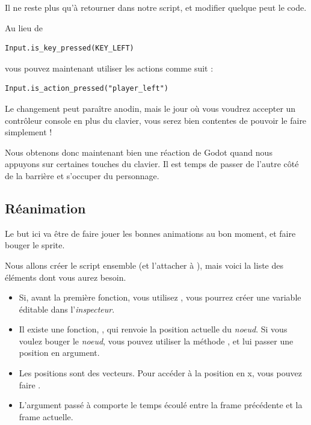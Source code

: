 Il ne reste plus qu'à retourner dans notre script, et modifier quelque peut le code.

Au lieu de

\begin{lstlisting}
Input.is_key_pressed(KEY_LEFT)
\end{lstlisting}

vous pouvez maintenant utiliser les actions comme suit :

\begin{lstlisting}
Input.is_action_pressed("player_left")
\end{lstlisting}

Le changement peut paraître anodin, mais le jour où vous voudrez accepter un contrôleur console en plus du clavier, vous serez bien contentes de pouvoir le faire simplement !

Nous obtenons donc maintenant bien une réaction de Godot quand nous appuyons sur certaines touches du clavier. Il est temps de passer de l'autre côté de la barrière et s'occuper du personnage.

\subsection{Réanimation}

Le but ici va être de faire jouer les bonnes animations au bon moment, et faire bouger le sprite.

Nous allons créer le script ensemble (et l'attacher à ), mais voici la liste des éléments dont vous aurez besoin.

\begin{itemize}
\item Si, avant la première fonction, vous utilisez , vous pourrez créer une variable éditable dans l'\emph{inspecteur}.
\item Il existe une fonction, , qui renvoie la position actuelle du \emph{noeud}. Si vous voulez bouger le \emph{noeud}, vous pouvez utiliser la méthode , et lui passer une position en argument.
\item Les positions sont des vecteurs. Pour accéder à la position en x, vous pouvez faire .
\item L'argument  passé à  comporte le temps écoulé entre la frame précédente et la frame actuelle.
\end{itemize}


